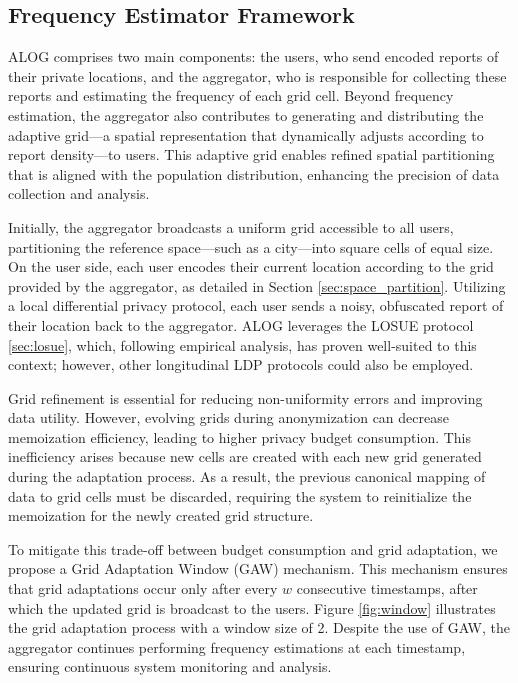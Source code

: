 \subsection{Frequency Estimator Framework}
\label{sec:fef}

ALOG comprises two main components: the users, who send encoded reports of their private locations, and the aggregator, who is responsible for collecting these reports and estimating the frequency of each grid cell. Beyond frequency estimation, the aggregator also contributes to generating and distributing the adaptive grid—a spatial representation that dynamically adjusts according to report density—to users. This adaptive grid enables refined spatial partitioning that is aligned with the population distribution, enhancing the precision of data collection and analysis.

Initially, the aggregator broadcasts a uniform grid accessible to all users, partitioning the reference space—such as a city—into square cells of equal size. On the user side, each user encodes their current location according to the grid provided by the aggregator, as detailed in Section \ref{sec:space_partition}. Utilizing a local differential privacy protocol, each user sends a noisy, obfuscated report of their location back to the aggregator. ALOG leverages the LOSUE protocol \ref{sec:losue}, which, following empirical analysis, has proven well-suited to this context; however, other longitudinal LDP protocols could also be employed.

Grid refinement is essential for reducing non-uniformity errors and improving data utility. However, evolving grids during anonymization can decrease memoization efficiency, leading to higher privacy budget consumption. This inefficiency arises because new cells are created with each new grid generated during the adaptation process. As a result, the previous canonical mapping of data to grid cells must be discarded, requiring the system to reinitialize the memoization for the newly created grid structure.

To mitigate this trade-off between budget consumption and grid adaptation, we propose a Grid Adaptation Window (GAW) mechanism. This mechanism ensures that grid adaptations occur only after every $w$ consecutive timestamps, after which the updated grid is broadcast to the users. Figure \ref{fig:window} illustrates the grid adaptation process with a window size of 2. Despite the use of GAW, the aggregator continues performing frequency estimations at each timestamp, ensuring continuous system monitoring and analysis. 

